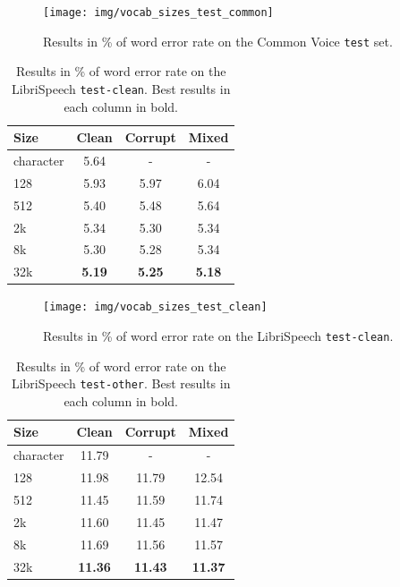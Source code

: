 \begin{figure}[p]
	\centering
	\texttt{[image: img/vocab\_sizes\_test\_common]}
	\caption{Results in \% of word error rate on the Common Voice \texttt{test} set.}
	\label{fig:vocab_sizes_common_graph}
\end{figure}


\begin{table}[p]
	\centering
	\begin{tabular}{l|ccc}
		\bf Size & \bf Clean & \bf Corrupt & \bf Mixed \\
		\hline
		
		character    &    5.64    &    -    &    - \\
		128    &    5.93    &    5.97    &    6.04 \\
		512    &    5.40    &    5.48    &    5.64 \\
		2k    &    5.34    &    5.30    &    5.34 \\
		8k    &    5.30    &    5.28    &    5.34 \\
		32k    &    \textbf{5.19}    &    \textbf{5.25}    &    \textbf{5.18} \\
		
	\end{tabular}
	
	\caption{Results in \% of word error rate on the LibriSpeech \texttt{test-clean}. Best results in each column in bold.}
	\label{tab:results_vocabularies_libri_clean}
\end{table}

\begin{figure}[p]
	\centering
	\texttt{[image: img/vocab\_sizes\_test\_clean]}
	\caption{Results in \% of word error rate on the LibriSpeech \texttt{test-clean}.}
	\label{fig:vocab_sizes_test_clean}
\end{figure}

\begin{table}[p]
	\centering
	\begin{tabular}{l|ccc}
		\bf Size & \bf Clean & \bf Corrupt & \bf Mixed \\
		\hline
		character    &    11.79    &    -    &    - \\
		128    &    11.98    &    11.79    &    12.54\\
		512    &    11.45    &    11.59    &    11.74\\
		2k    &    11.60    &    11.45    &    11.47\\
		8k    &    11.69    &    11.56    &    11.57\\
		32k    &    \textbf{11.36}    &    \textbf{11.43}    &    \textbf{11.37}\\
		
	\end{tabular}
	
	\caption{Results in \% of word error rate on the LibriSpeech \texttt{test-other}. Best results in each column in bold.}
	\label{tab:results_vocabularies_libri_other}
\end{table}

